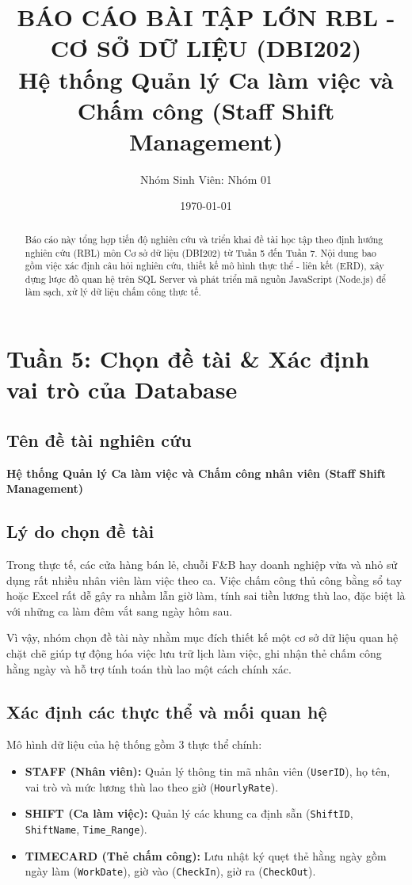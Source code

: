 \documentclass[12pt,a4paper]{article}
\title{\textbf{BÁO CÁO BÀI TẬP LỚN RBL - CƠ SỞ DỮ LIỆU (DBI202)}\\
\large Hệ thống Quản lý Ca làm việc và Chấm công (Staff Shift Management)}
\author{Nhóm Sinh Viên: Nhóm 01}
\date{\today}
\begin{document}
\maketitle

\begin{abstract}
Báo cáo này tổng hợp tiến độ nghiên cứu và triển khai đề tài học tập theo định hướng nghiên cứu (RBL) môn Cơ sở dữ liệu (DBI202) từ Tuần 5 đến Tuần 7. Nội dung bao gồm việc xác định câu hỏi nghiên cứu, thiết kế mô hình thực thể - liên kết (ERD), xây dựng lược đồ quan hệ trên SQL Server và phát triển mã nguồn JavaScript (Node.js) để làm sạch, xử lý dữ liệu chấm công thực tế.
\end{abstract}

\tableofcontents
\newpage

\section{Tuần 5: Chọn đề tài \& Xác định vai trò của Database}

\subsection{Tên đề tài nghiên cứu}
\textbf{Hệ thống Quản lý Ca làm việc và Chấm công nhân viên (Staff Shift Management)}

\subsection{Lý do chọn đề tài}
Trong thực tế, các cửa hàng bán lẻ, chuỗi F\&B hay doanh nghiệp vừa và nhỏ sử dụng rất nhiều nhân viên làm việc theo ca. Việc chấm công thủ công bằng sổ tay hoặc Excel rất dễ gây ra nhầm lẫn giờ làm, tính sai tiền lương thù lao, đặc biệt là với những ca làm đêm vắt sang ngày hôm sau.

Vì vậy, nhóm chọn đề tài này nhằm mục đích thiết kế một cơ sở dữ liệu quan hệ chặt chẽ giúp tự động hóa việc lưu trữ lịch làm việc, ghi nhận thẻ chấm công hằng ngày và hỗ trợ tính toán thù lao một cách chính xác.

\subsection{Xác định các thực thể và mối quan hệ}
Mô hình dữ liệu của hệ thống gồm 3 thực thể chính:
\begin{itemize}
    \item \textbf{STAFF (Nhân viên):} Quản lý thông tin mã nhân viên (\texttt{UserID}), họ tên, vai trò và mức lương thù lao theo giờ (\texttt{HourlyRate}).
    \item \textbf{SHIFT (Ca làm việc):} Quản lý các khung ca định sẵn (\texttt{ShiftID}, \texttt{ShiftName}, \texttt{Time\_Range}).
    \item \textbf{TIMECARD (Thẻ chấm công):} Lưu nhật ký quẹt thẻ hằng ngày gồm ngày làm (\texttt{WorkDate}), giờ vào (\texttt{CheckIn}), giờ ra (\texttt{CheckOut}).
\end{itemize}
\end{document}
